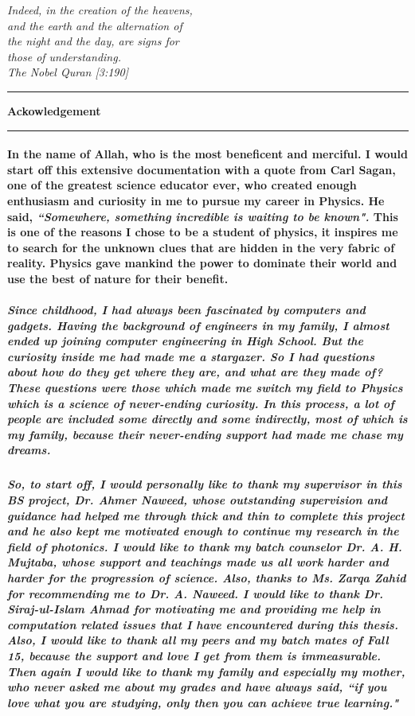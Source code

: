 \documentclass[12pt,twoside]{report}
\begin{document}

\newpage
\pagestyle{empty}
\begin{flushright}
\textit{\small{Indeed, in the creation of the heavens,\\ and the earth and the alternation of\\ the night and the day, are signs for\\ those of understanding.\\ The Nobel Quran [3:190]}}
\end{flushright}
\noindent\rule{15cm}{1pt}
\begin{flushleft}
\textbf{\Large{Ackowledgement}}
\end{flushleft}
\noindent\rule{15cm}{1pt} 
\paragraph{ \normalfont In the name of Allah, who is the most beneficent and merciful. I would start off this extensive documentation with a quote from Carl Sagan, one of the greatest science educator ever, who created enough enthusiasm and curiosity in me to pursue my career in Physics. He said, \textit{“Somewhere, something incredible is waiting to be known".} This is one of the reasons I chose to be a student of physics, it inspires me to search for the unknown clues that are hidden in the very fabric of reality. Physics gave mankind the power to dominate their world and use the best of nature for their benefit.}
\subparagraph{ \normalfont Since childhood, I had always been fascinated by computers and gadgets. Having the background of engineers in my family, I almost ended up joining computer engineering in High School. But the curiosity inside me had made me a stargazer. So I had questions about how do they get where they are, and what are they made of? These questions were those which made me switch my field to Physics which is a science of never-ending curiosity. In this process, a lot of people are included some directly and some indirectly, most of which is my family, because their never-ending support had made me chase my dreams.}
\subparagraph{ \normalfont So, to start off, I would personally like to thank my supervisor in this BS project, Dr. Ahmer Naweed, whose outstanding supervision and guidance had helped me through thick and thin to complete this project and he also kept me motivated enough to continue my research in the field of photonics. I would like to thank my batch counselor Dr. A. H. Mujtaba, whose support and teachings made us all work harder and harder for the progression of science. Also, thanks to Ms. Zarqa Zahid for recommending me to Dr. A. Naweed. I would like to thank Dr. Siraj-ul-Islam Ahmad for motivating me and providing me help in computation related issues that I have encountered during this thesis. Also, I would like to thank all my peers and my batch mates of Fall 15, because the support and love I get from them is immeasurable. Then again I would like to thank my family and especially my mother, who never asked me about my grades and have always said, “if you love what you are studying, only then you can achieve true learning."}
\end{document}
